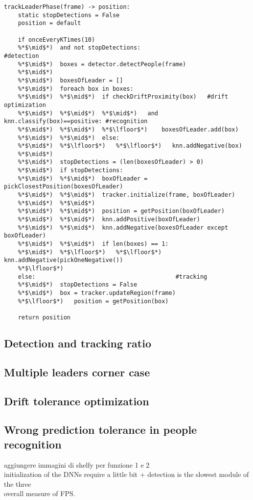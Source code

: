 \begin{lstlisting}[captionpos=b, 
	caption={It is the pseudocode of the second phase. The function \textit{track leader} alternatively run the detection and tracking modules to constantly knows the position of the Leader.}, 
	label=alg:trackLeaderPhase
	]
trackLeaderPhase(frame) -> position:
	static stopDetections = False
	position = default
	
	if onceEveryKTimes(10) 
	%*$\mid$*)  and not stopDetections: 					 #detection
	%*$\mid$*)	boxes = detector.detectPeople(frame)
	%*$\mid$*)	
	%*$\mid$*)	boxesOfLeader = []
	%*$\mid$*)	foreach box in boxes:
	%*$\mid$*)	%*$\mid$*)	if checkDriftProximity(box)	  #drift optimization
	%*$\mid$*)	%*$\mid$*)	%*$\mid$*)   and knn.classify(box)==positive: #recognition
	%*$\mid$*)	%*$\mid$*)	%*$\lfloor$*)	 boxesOfLeader.add(box)
	%*$\mid$*)	%*$\mid$*)	else:
	%*$\mid$*)	%*$\lfloor$*)	%*$\lfloor$*)	knn.addNegative(box)
	%*$\mid$*)			
	%*$\mid$*)	stopDetections = (len(boxesOfLeader) > 0)
	%*$\mid$*)	if stopDetections:
	%*$\mid$*)	%*$\mid$*)	boxOfLeader = pickClosestPosition(boxesOfLeader) 
	%*$\mid$*)	%*$\mid$*)	tracker.initialize(frame, boxOfLeader)
	%*$\mid$*)	%*$\mid$*)	
	%*$\mid$*)	%*$\mid$*)	position = getPosition(boxOfLeader)
	%*$\mid$*)	%*$\mid$*)	knn.addPositive(boxOfLeader)			 
	%*$\mid$*)	%*$\mid$*)	knn.addNegative(boxesOfLeader except boxOfLeader)
	%*$\mid$*)	%*$\mid$*)	if len(boxes) == 1:
	%*$\mid$*)	%*$\lfloor$*)	%*$\lfloor$*)	knn.addNegative(pickOneNegative())
	%*$\lfloor$*)		
	else: 										 #tracking
	%*$\mid$*)	stopDetections = False
	%*$\mid$*)	box = tracker.updateRegion(frame)
	%*$\lfloor$*)	position = getPosition(box)
	
	return position
\end{lstlisting}

\subsection{Detection and tracking ratio} \label{sec:ratioDetectTrack}
\subsection{Multiple leaders corner case} \label{sec:multipleLeaders}
\subsection{Drift tolerance optimization} \label{sec:driftOptimization}
\subsection{Wrong prediction tolerance in people recognition} \label{sec:knnToleranceToFN}
aggiungere immagini di shelfy per funzione 1 e 2\\
initialization of the DNNs require a little bit + detection is the slowest module of the three\\
overall measure of FPS.
